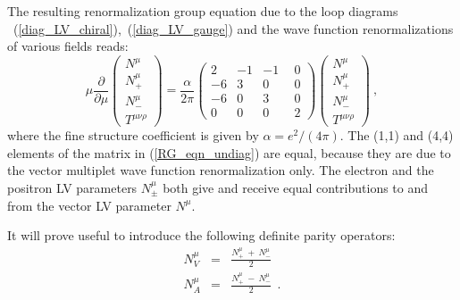 \documentclass[12pt]{revtex4}
\begin{document}
The resulting renormalization group equation due to the loop diagrams 
~(\ref{diag_LV_chiral}),~(\ref{diag_LV_gauge}) and the wave function
renormalizations of various fields reads:
\begin{equation}
\label{RG_eqn_undiag}
     \mu \frac{\partial}
              {\partial\mu} 
                \left(
\begin{array}{c}
                   N^\mu \\ 
   N_+^\mu \\
                   N_{-}^\mu \\
   T^{\mu\nu\rho}
                \end{array} \right) = 
     \frac{\alpha}
          {2 \pi} 
     \left(\begin{array}{rrrr}
                    2 & -1 & -1 & ~~0 \\
   -6 &  3 &  0 & ~~0 \\
                   -6 &  0 &  3 & ~~0 \\
    0 &  0 &  0 & ~~2
           \end{array}\right)
     \left(
  \begin{array}{c}
                 N^\mu \\ 
 N_+^\mu \\
                 N_{-}^\mu \\
 T^{\mu\nu\rho}
          \end{array} \right)~,
\end{equation}
where the fine structure coefficient is given by $\alpha =
e^2/(4\pi)$. The (1,1) and (4,4) elements of the matrix in
(\ref{RG_eqn_undiag}) are equal, because they are due to the vector 
multiplet wave function renormalization only. The electron and the
positron LV parameters $N_\pm^\mu$ both give and receive equal
contributions to and from the vector LV parameter $N^\mu$. 

It will prove useful to introduce the following definite parity
operators:
\begin{eqnarray}
\label{def_Nmu}
\nonumber
      N^\mu_V & = & \frac{ N_+^\mu ~+~ N_-^\mu }{2}~~  
	\\
      N^\mu_A & = & \frac{ N_+^\mu ~-~ N_-^\mu }{2}~~.
\end{eqnarray}
\end{document}
